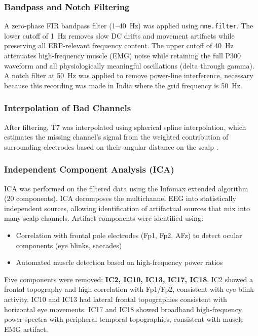 \documentclass[11pt, a4paper, twocolumn]{article}
\begin{document}
\subsubsection{Bandpass and Notch Filtering}

A zero-phase FIR bandpass filter (1--40~Hz) was applied using
\texttt{mne.filter}. The lower cutoff of 1~Hz removes slow DC drifts and
movement artifacts while preserving all ERP-relevant frequency content.
The upper cutoff of 40~Hz attenuates high-frequency muscle (EMG) noise
while retaining the full P300 waveform and all physiologically meaningful
oscillations (delta through gamma). A notch filter at 50~Hz was applied
to remove power-line interference, necessary because this recording was
made in India where the grid frequency is 50~Hz.

\subsubsection{Interpolation of Bad Channels}

After filtering, T7 was interpolated using spherical spline interpolation,
which estimates the missing channel's signal from the weighted contribution
of surrounding electrodes based on their angular distance on the scalp
\citep{Luck2005}.

\subsubsection{Independent Component Analysis (ICA)}

ICA was performed on the filtered data using the Infomax extended algorithm
(20 components). ICA decomposes the multichannel EEG into statistically
independent sources, allowing identification of artifactual sources that
mix into many scalp channels. Artifact components were identified using:

\begin{itemize}\setlength{\itemsep}{1pt}\setlength{\parskip}{0pt}
    \item Correlation with frontal pole electrodes (Fp1, Fp2, AFz) to detect
    ocular components (eye blinks, saccades)
    \item Automated muscle detection based on high-frequency power ratios
\end{itemize}

Five components were removed: \textbf{IC2, IC10, IC13, IC17, IC18}. IC2
showed a frontal topography and high correlation with Fp1/Fp2, consistent
with eye blink activity. IC10 and IC13 had lateral frontal topographies
consistent with horizontal eye movements. IC17 and IC18 showed broadband
high-frequency power spectra with peripheral temporal topographies,
consistent with muscle EMG artifact.
\end{document}
